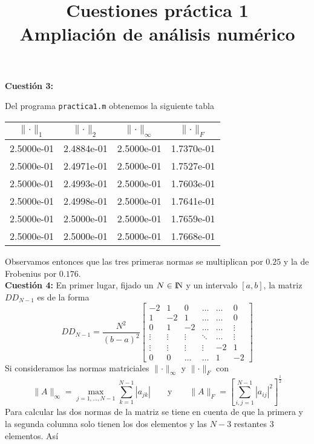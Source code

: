 \documentclass[12pt]{article}
\title{\textbf{Cuestiones práctica 1\\ {\small Ampliación de análisis numérico}}}
\date{}
\newcommand{\NN}{{\rm I\!N}}
\newcommand{\abs}[1]{\left|#1\right|}
\newcommand{\norm}[1]{\lVert #1\rVert}
\theoremstyle{definition}
\begin{document}
\maketitle

\newpage 
\noindent\textbf{Cuestión 3:}

Del programa \texttt{practica1.m} obtenemos la siguiente tabla
{\Large \begin{center}
		\begin{tabular}{ | c | c | c | c |}
			\hline
			$\norm{\cdot}_1$ & $\norm{\cdot}_2$ & $\norm{\cdot}_\infty$ & $\norm{\cdot}_F$ \\
			\hline\hline
			2.5000e-01 & 2.4884e-01 & 2.5000e-01 & 1.7370e-01 \\
			2.5000e-01 & 2.4971e-01 & 2.5000e-01 & 1.7527e-01 \\
			2.5000e-01 & 2.4993e-01 & 2.5000e-01 & 1.7603e-01 \\
			2.5000e-01 & 2.4998e-01 & 2.5000e-01 & 1.7641e-01 \\
			2.5000e-01 & 2.5000e-01 & 2.5000e-01 & 1.7659e-01 \\
			2.5000e-01 & 2.5000e-01 & 2.5000e-01 & 1.7668e-01 \\
			\hline
		\end{tabular}
\end{center}}
Observamos entonces que las tres primeras normas se multiplican por $0.25$ y la de Frobenius por $0.176$. \\
\newline 
\noindent\textbf{Cuestión 4:} En primer lugar, fijado un $N\in\NN$ y un intervalo $[a,b]$, la matriz $DD_{N-1}$ es de la forma
$$DD_{N-1} = \frac{N^2}{(b-a)^2}\begin{bmatrix}
	-2 & 1 & 0 & \dots & \dots & 0 \\
	1 & -2  & 1 & \dots  & \dots  & 0 \\
	0 & 1 & -2 & \dots & \dots & \vdots \\
	\vdots  & \vdots & \vdots & \ddots & \dots & \vdots \\
	\vdots & \vdots & \vdots & \vdots & -2 & 1 \\
	0 & 0 & \dots & \dots & 1 & -2 
\end{bmatrix}$$
Si consideramos las normas matriciales $\norm{\cdot}_\infty$ y $\norm{\cdot}_F$ con
$$\norm{A}_\infty = \max_{j = 1,\dots, N - 1}\sum_{k=1}^{N-1}\abs{a_{jk}} \quad \quad \text{y} \quad \quad \norm{A}_F = \left[\sum_{i,j=1}^{N-1}\abs{a_{ij}}^2\right]^{\frac{1}{2}}$$
Para calcular las dos normas de la matriz se tiene en cuenta de que la primera y la segunda columna solo tienen los dos elementos y las $N - 3$ restantes 3 elementos. Así
\end{document}
